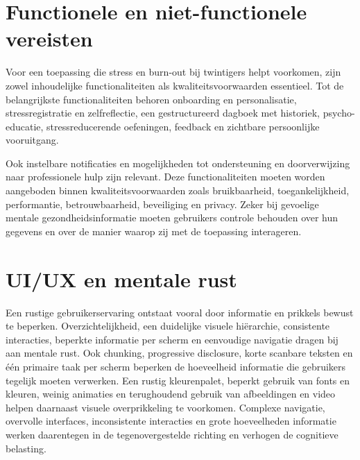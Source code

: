 \vspace{1em}


\section{Functionele en niet-functionele vereisten}
\label{sec:requirements-conclusie}

\vspace{1em}

Voor een toepassing die stress en burn-out bij twintigers helpt voorkomen, zijn zowel inhoudelijke functionaliteiten als kwaliteitsvoorwaarden essentieel. Tot de belangrijkste functionaliteiten behoren onboarding en personalisatie, stressregistratie en zelfreflectie, een gestructureerd dagboek met historiek, psycho-educatie, stressreducerende oefeningen, feedback en zichtbare persoonlijke vooruitgang. 

Ook instelbare notificaties en mogelijkheden tot ondersteuning en doorverwijzing naar professionele hulp zijn relevant. Deze functionaliteiten moeten worden aangeboden binnen kwaliteitsvoorwaarden zoals bruikbaarheid, toegankelijkheid, performantie, betrouwbaarheid, beveiliging en privacy. Zeker bij gevoelige mentale gezondheidsinformatie moeten gebruikers controle behouden over hun gegevens en over de manier waarop zij met de toepassing interageren.

\vspace{1em}


\section{UI/UX en mentale rust}
\label{sec:UI-UX-mentale-rust}

\vspace{1em}

Een rustige gebruikerservaring ontstaat vooral door informatie en prikkels bewust te beperken. Overzichtelijkheid, een duidelijke visuele hiërarchie, consistente interacties, beperkte informatie per scherm en eenvoudige navigatie dragen bij aan mentale rust. Ook chunking, progressive disclosure, korte scanbare teksten en één primaire taak per scherm beperken de hoeveelheid informatie die gebruikers tegelijk moeten verwerken. Een rustig kleurenpalet, beperkt gebruik van fonts en kleuren, weinig animaties en terughoudend gebruik van afbeeldingen en video helpen daarnaast visuele overprikkeling te voorkomen. Complexe navigatie, overvolle interfaces, inconsistente interacties en grote hoeveelheden informatie werken daarentegen in de tegenovergestelde richting en verhogen de cognitieve belasting.

